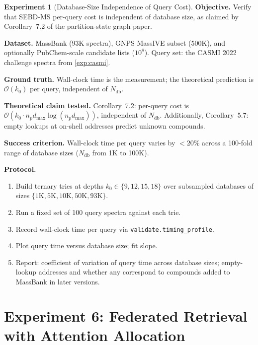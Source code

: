 \documentclass[11pt,a4paper]{article}
\theoremstyle{planstyle}
\theoremstyle{definition}
\newtheorem{experiment}[theorem]{Experiment}
\theoremstyle{remark}
\newcommand{\shk}[1]{\texttt{#1}}
\begin{document}
\begin{experiment}[Database-Size Independence of Query Cost]
\label{exp:scaling}
\textbf{Objective.} Verify that SEBD-MS per-query cost is independent
of database size, as claimed by Corollary~7.2 of the partition-state
graph paper.

\textbf{Dataset.} MassBank (93K spectra), GNPS MassIVE subset (500K),
and optionally PubChem-scale candidate lists ($10^8$). Query set: the
CASMI 2022 challenge spectra from \cref{exp:casmi}.

\textbf{Ground truth.} Wall-clock time is the measurement; the
theoretical prediction is $\mathcal{O}(k_0)$ per query, independent
of $N_{\text{db}}$.

\textbf{Theoretical claim tested.} Corollary~7.2: per-query cost is
$\mathcal{O}(k_0 \cdot n_p d_{\max} \log(n_p d_{\max}))$, independent
of $N_{\text{db}}$. Additionally, Corollary~5.7: empty lookups at
on-shell addresses predict unknown compounds.

\textbf{Success criterion.} Wall-clock time per query varies by $< 20\%$
across a 100-fold range of database sizes ($N_{\text{db}}$ from 1K to
100K).

\textbf{Protocol.}
\begin{enumerate}[nosep]
\item Build ternary tries at depths $k_0 \in \{9, 12, 15, 18\}$ over
  subsampled databases of sizes $\{1\text{K}, 5\text{K}, 10\text{K},
  50\text{K}, 93\text{K}\}$.
\item Run a fixed set of 100 query spectra against each trie.
\item Record wall-clock time per query via
  \shk{validate.timing\_profile}.
\item Plot query time versus database size; fit slope.
\item Report: coefficient of variation of query time across database
  sizes; empty-lookup addresses and whether any correspond to compounds
  added to MassBank in later versions.
\end{enumerate}
\end{experiment}

\section{Experiment 6: Federated Retrieval with Attention Allocation}
\label{sec:exp-federated}
\end{document}

